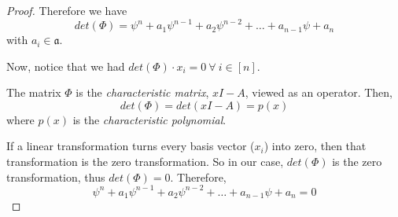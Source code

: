 \documentclass{article}
\theoremstyle{definition}
\newcommand{\aA}{\mathfrak{a}} %
\begin{document}
\begin{proof}
  Therefore we have
  $$det(\Phi) = \psi^n + a_1 \psi^{n-1} + a_2 \psi^{n-2} + \ldots + a_{n-1} \psi + a_n$$
  with $a_i \in \aA$.

  \vspace{0.5cm}

  Now, notice that we had $det(\Phi) \cdot x_i = 0 ~\forall~ i\in [n]$.

  The matrix $\Phi$ is the \emph{characteristic matrix}, $xI-A$, viewed as an operator. Then,
  $$det(\Phi) = det(xI-A) = p(x)$$
  where $p(x)$ is the \emph{characteristic polynomial}.

  If a linear transformation turns every basis vector ($x_i$) into zero, then that transformation is the zero transformation. So in our case, $det(\Phi)$ is the zero transformation, thus $det(\Phi)=0$.
  Therefore,
  $$\psi^n + a_1 \psi^{n-1} + a_2 \psi^{n-2} + \ldots + a_{n-1} \psi + a_n = 0$$




\end{proof}
\end{document}
